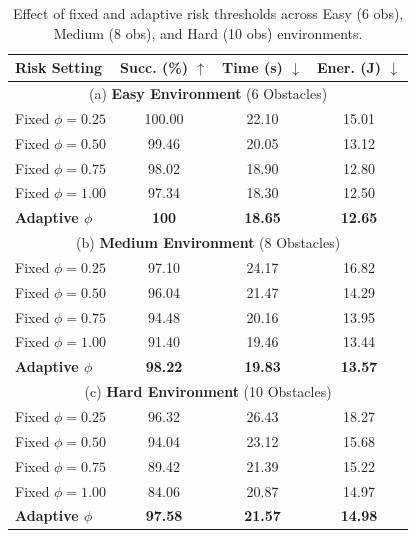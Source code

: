 \documentclass[runningheads]{llncs}
\begin{document}
\begin{table}[!htbp]
\centering
\caption{Effect of fixed and adaptive risk thresholds across Easy (6 obs), Medium (8 obs), and Hard (10 obs) environments.}
\label{tab:ablation_phi}
\setlength{\tabcolsep}{6pt}
\renewcommand{\arraystretch}{1.10}
\begin{tabular*}{\linewidth}{@{\extracolsep{\fill}}l|ccc@{}}
\hline
Risk Setting & Succ. (\%) $\uparrow$ & Time (s) $\downarrow$ & Ener. (J) $\downarrow$ \\
\hline
\hline
\multicolumn{4}{c}{(a) \textbf{Easy Environment} (6 Obstacles)}\\
\hline
Fixed $\phi=0.25$ & 100.00 & 22.10 & 15.01 \\
Fixed $\phi=0.50$ & 99.46 & 20.05 & 13.12 \\
Fixed $\phi=0.75$ & 98.02 & 18.90 & 12.80 \\
Fixed $\phi=1.00$ & 97.34 & 18.30 & 12.50 \\
\textbf{Adaptive $\phi$} & \textbf{100} & \textbf{18.65} & \textbf{12.65} \\
\hline
\hline
\multicolumn{4}{c}{(b) \textbf{Medium Environment} (8 Obstacles)}\\
\hline
Fixed $\phi=0.25$ & 97.10 & 24.17 & 16.82 \\
Fixed $\phi=0.50$ & 96.04 & 21.47 & 14.29 \\
Fixed $\phi=0.75$ & 94.48 & 20.16 & 13.95 \\
Fixed $\phi=1.00$ & 91.40 & 19.46 & 13.44 \\
\textbf{Adaptive $\phi$} & \textbf{98.22} & \textbf{19.83} & \textbf{13.57} \\
\hline
\hline
\multicolumn{4}{c}{(c) \textbf{Hard Environment} (10 Obstacles)}\\
\hline
Fixed $\phi=0.25$ & 96.32 & 26.43 & 18.27 \\
Fixed $\phi=0.50$ & 94.04 & 23.12 & 15.68 \\
Fixed $\phi=0.75$ & 89.42 & 21.39 & 15.22 \\
Fixed $\phi=1.00$ & 84.06 & 20.87 & 14.97 \\
\textbf{Adaptive $\phi$} & \textbf{97.58} & \textbf{21.57} & \textbf{14.98} \\
\hline
\end{tabular*}
\end{table}
\end{document}
